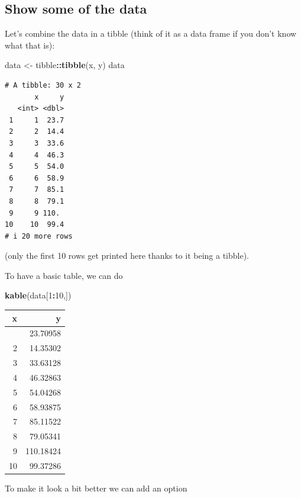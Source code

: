 \documentclass[
]{article}
\newenvironment{Shaded}{\begin{snugshade}}{\end{snugshade}}
\newcommand{\DecValTok}[1]{\textcolor[rgb]{0.00,0.00,0.81}{#1}}
\newcommand{\FunctionTok}[1]{\textcolor[rgb]{0.13,0.29,0.53}{\textbf{#1}}}
\newcommand{\NormalTok}[1]{#1}
\newcommand{\OtherTok}[1]{\textcolor[rgb]{0.56,0.35,0.01}{#1}}
\newcommand{\SpecialCharTok}[1]{\textcolor[rgb]{0.81,0.36,0.00}{\textbf{#1}}}
\begin{document}
\subsection{Show some of the data}\label{show-some-of-the-data}

Let's combine the data in a tibble (think of it as a data frame if you
don't know what that is):

\begin{Shaded}
\begin{Highlighting}[]
\NormalTok{data }\OtherTok{\textless{}{-}}\NormalTok{ tibble}\SpecialCharTok{::}\FunctionTok{tibble}\NormalTok{(x, y)}
\NormalTok{data}
\end{Highlighting}
\end{Shaded}

\begin{verbatim}
# A tibble: 30 x 2
       x     y
   <int> <dbl>
 1     1  23.7
 2     2  14.4
 3     3  33.6
 4     4  46.3
 5     5  54.0
 6     6  58.9
 7     7  85.1
 8     8  79.1
 9     9 110. 
10    10  99.4
# i 20 more rows
\end{verbatim}

(only the first 10 rows get printed here thanks to it being a tibble).

To have a basic table, we can do

\begin{Shaded}
\begin{Highlighting}[]
\FunctionTok{kable}\NormalTok{(data[}\DecValTok{1}\SpecialCharTok{:}\DecValTok{10}\NormalTok{,])}
\end{Highlighting}
\end{Shaded}

\begin{longtable}[]{@{}rr@{}}
\toprule\noalign{}
x & y \\
\midrule\noalign{}
\endhead
\bottomrule\noalign{}
\endlastfoot
1 & 23.70958 \\
2 & 14.35302 \\
3 & 33.63128 \\
4 & 46.32863 \\
5 & 54.04268 \\
6 & 58.93875 \\
7 & 85.11522 \\
8 & 79.05341 \\
9 & 110.18424 \\
10 & 99.37286 \\
\end{longtable}

To make it look a bit better we can add an option
\end{document}
